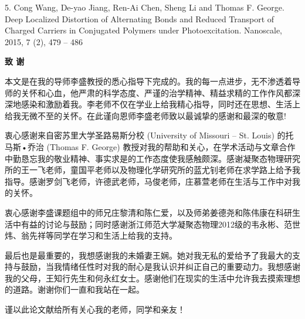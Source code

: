\documentclass[12pt,]{report}
\begin{document}
5.	Cong Wang, De-yao Jiang, Ren-Ai Chen, Sheng Li and Thomas F. George. Deep Localized Distortion of Alternating Bonds and Reduced Transport of Charged Carriers in Conjugated Polymers under Photoexcitation. Nanoscale, 2015, 7 (2), 479 – 486 
\clearpage\pagestyle{empty}\mbox{}\clearpage
\vspace{1.5cm}
\clearpage



\clearpage
\vspace*{0.0cm}

\begin{center}
\Large \textbf{致  谢}
\end{center}\vspace{0.54cm}

\pagestyle{plain}

\vspace{1.5cm}


本文是在我的导师李盛教授的悉心指导下完成的。我的每一点进步，无不渗透着导师的关怀和心血，他严肃的科学态度、严谨的治学精神、精益求精的工作作风都深深地感染和激励着我。李老师不仅在学业上给我精心指导，同时还在思想、生活上给我无微不至的关怀。在此谨向恩师李盛老师致以最诚挚的感谢和最深的敬意! 

衷心感谢来自密苏里大学圣路易斯分校 (University of Missouri – St. Louis) 的托马斯•乔治 (Thomas F. George) 教授对我的帮助和关心，在学术活动与文章合作中勤恳忘我的敬业精神、事实求是的工作态度使我感触颇深。感谢凝聚态物理研究所的王一飞老师，童国平老师以及物理化学研究所的蓝尤钊老师在求学路上给予我指导。感谢罗剑飞老师，许德武老师，马俊老师，庄慕萱老师在生活与工作中对我的关怀。

衷心感谢李盛课题组中的师兄庄黎清和陈仁爱，以及师弟姜德尧和陈伟康在科研生活中有益的讨论与鼓励；同时感谢浙江师范大学凝聚态物理2012级的韦永彬、范世炜、翁先祥等同学在学习和生活上给我的支持。

最后也是最重要的，我想感谢我的未婚妻王娴。她对我无私的爱给予了我最大的支持与鼓励，当我情绪任性时对我的耐心是我认识并纠正自己的重要动力。我想感谢我的父母，王知行先生和何永红女士。感谢他们在现实的生活中允许我去摸索理想的道路。谢谢你们一直和我站在一起。

谨以此论文献给所有关心我的老师，同学和亲友！ 



\vspace{1.5cm}
\clearpage
\vspace{1.5cm}
\clearpage
\end{document}
